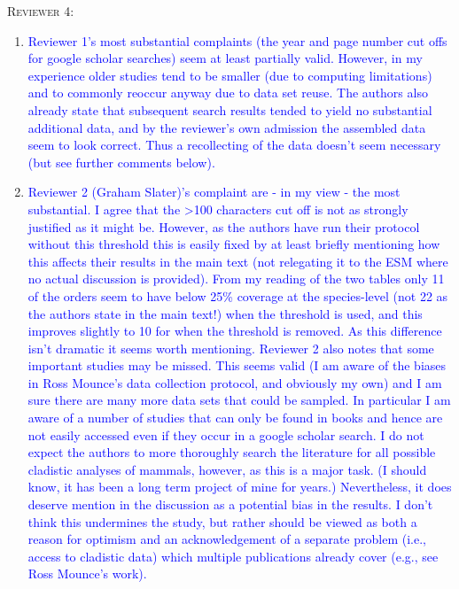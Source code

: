 \documentclass[12pt,letterpaper]{article}
\renewcommand{\section}[1]{%
\bigskip
\begin{center}
\begin{Large}
\normalfont\scshape #1
\medskip
\end{Large}
\end{center}}
\begin{document}
\section{Reviewer 4:}
\begin{enumerate}
\item{\textcolor{blue}{Reviewer 1's most substantial complaints (the year and page number cut offs for google scholar searches) seem at least partially valid.
However, in my experience older studies tend to be smaller (due to computing limitations) and to commonly reoccur anyway due to data set reuse.
The authors also already state that subsequent search results tended to yield no substantial additional data, and by the reviewer's own admission the assembled data seem to look correct.
Thus a recollecting of the data doesn't seem necessary (but see further comments below).}}


\item{\textcolor{blue}{Reviewer 2 (Graham Slater)'s complaint are - in my view - the most substantial.
I agree that the >100 characters cut off is not as strongly justified as it might be.
However, as the authors have run their protocol without this threshold this is easily fixed by at least briefly mentioning how this affects their results in the main text (not relegating it to the ESM where no actual discussion is provided).
From my reading of the two tables only 11 of the orders seem to have below 25\% coverage at the species-level (not 22 as the authors state in the main text!) when the threshold is used, and this improves slightly to 10 for when the threshold is removed.
As this difference isn't dramatic it seems worth mentioning.
Reviewer 2 also notes that some important studies may be missed.
This seems valid (I am aware of the biases in Ross Mounce's data collection protocol, and obviously my own) and I am sure there are many more data sets that could be sampled.
In particular I am aware of a number of studies that can only be found in books and hence are not easily accessed even if they occur in a google scholar search.
I do not expect the authors to more thoroughly search the literature for all possible cladistic analyses of mammals, however, as this is a major task.
(I should know, it has been a long term project of mine for years.)
Nevertheless, it does deserve mention in the discussion as a potential bias in the results.
I don't think this undermines the study, but rather should be viewed as both a reason for optimism and an acknowledgement of a separate problem (i.e., access to cladistic data) which multiple publications already cover (e.g., see Ross Mounce's work).}}


\end{enumerate}
\end{document}
